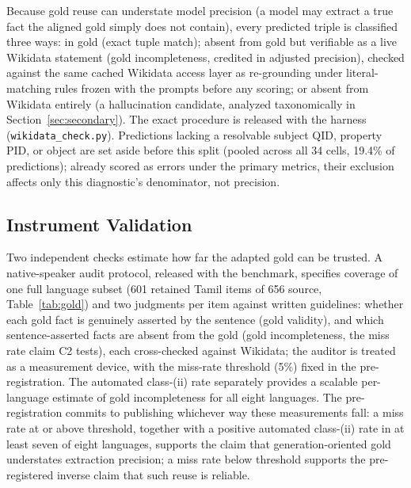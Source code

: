 \documentclass{llncs}
\begin{document}
Because gold reuse can understate model precision (a model may extract a
true fact the aligned gold simply does not contain), every predicted triple
is classified three ways: in gold (exact tuple match); absent from gold but
verifiable as a live Wikidata statement (gold incompleteness, credited in
adjusted precision), checked against the same cached Wikidata access layer
as re-grounding under literal-matching rules frozen with the prompts before
any scoring; or absent from Wikidata entirely (a hallucination candidate,
analyzed taxonomically in Section~\ref{sec:secondary}). The exact procedure
is released with the harness (\texttt{wikidata\_check.py}). Predictions
lacking a resolvable subject QID, property PID, or object are set aside
before this split (pooled across all 34 cells, 19.4\% of predictions);
already scored as errors under
the primary metrics, their exclusion affects only this diagnostic's
denominator, not precision.

\subsection{Instrument Validation}
Two independent checks estimate how far the adapted gold can be trusted. A
native-speaker audit protocol, released with the benchmark, specifies
coverage of one full language subset (601 retained Tamil items of 656
source, Table~\ref{tab:gold}) and two judgments per item against written
guidelines: whether each gold fact is genuinely asserted by the sentence
(gold validity), and which sentence-asserted facts are absent from the gold
(gold incompleteness, the miss rate claim C2 tests), each cross-checked
against Wikidata; the auditor is treated as a measurement device, with the
miss-rate threshold (5\%) fixed in the pre-registration.
The automated class-(ii) rate separately provides a scalable per-language
estimate of gold incompleteness for all eight languages. The pre-registration
commits to publishing whichever way these measurements fall: a miss rate at
or above threshold, together with a positive automated class-(ii) rate in at
least seven of eight languages, supports the claim that generation-oriented
gold understates extraction precision; a miss rate below threshold supports
the pre-registered inverse claim that such reuse is reliable.
\end{document}
